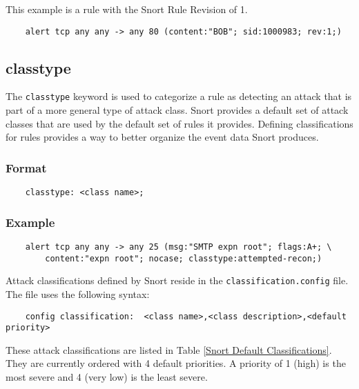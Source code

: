 \documentclass[english]{report}
\begin{document}
This example is a rule with the Snort Rule Revision of 1.

\begin{verbatim}
    alert tcp any any -> any 80 (content:"BOB"; sid:1000983; rev:1;)
\end{verbatim}

\subsection{classtype}

The \texttt{classtype} keyword is used to categorize a rule as detecting an
attack that is part of a more general type of attack class. Snort provides a
default set of attack classes that are used by the default set of rules it
provides. Defining classifications for rules provides a way to better organize
the event data Snort produces.

\subsubsection{Format}

\begin{verbatim}
    classtype: <class name>;
\end{verbatim}

\subsubsection{Example}

\begin{verbatim}
    alert tcp any any -> any 25 (msg:"SMTP expn root"; flags:A+; \
        content:"expn root"; nocase; classtype:attempted-recon;)
\end{verbatim}

Attack classifications defined by Snort reside in the
\texttt{classification.config} file. The file uses the following syntax:

\begin{verbatim}
    config classification:  <class name>,<class description>,<default priority>
\end{verbatim}

These attack classifications are listed in Table \ref{Snort Default
Classifications}. They are currently ordered with 4 default priorities. A
priority of 1 (high) is the most severe and 4 (very low) is the least severe.
\end{document}
